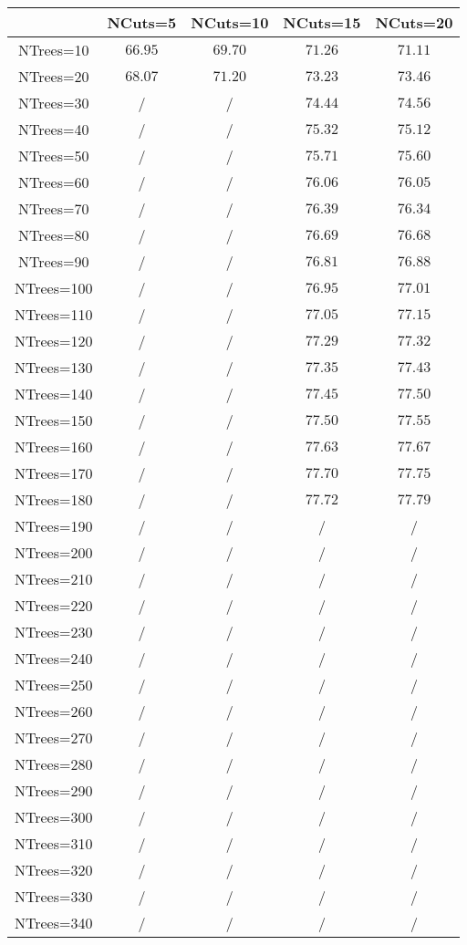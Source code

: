 \centering
\begin{tabular}{|c|c|c|c|c|} \hline
 & NCuts=5 & NCuts=10 & NCuts=15 & NCuts=20\\\hline
NTrees=10 & $66.95$ & $69.70$ & $71.26$ & $71.11$\\\hline
NTrees=20 & $68.07$ & $71.20$ & $73.23$ & $73.46$\\\hline
NTrees=30 &  / &  / & $74.44$ & $74.56$\\\hline
NTrees=40 &  / &  / & $75.32$ & $75.12$\\\hline
NTrees=50 &  / &  / & $75.71$ & $75.60$\\\hline
NTrees=60 &  / &  / & $76.06$ & $76.05$\\\hline
NTrees=70 &  / &  / & $76.39$ & $76.34$\\\hline
NTrees=80 &  / &  / & $76.69$ & $76.68$\\\hline
NTrees=90 &  / &  / & $76.81$ & $76.88$\\\hline
NTrees=100 &  / &  / & $76.95$ & $77.01$\\\hline
NTrees=110 &  / &  / & $77.05$ & $77.15$\\\hline
NTrees=120 &  / &  / & $77.29$ & $77.32$\\\hline
NTrees=130 &  / &  / & $77.35$ & $77.43$\\\hline
NTrees=140 &  / &  / & $77.45$ & $77.50$\\\hline
NTrees=150 &  / &  / & $77.50$ & $77.55$\\\hline
NTrees=160 &  / &  / & $77.63$ & $77.67$\\\hline
NTrees=170 &  / &  / & $77.70$ & $77.75$\\\hline
NTrees=180 &  / &  / & $77.72$ & $77.79$\\\hline
NTrees=190 &  / &  / &  / &  /\\\hline
NTrees=200 &  / &  / &  / &  /\\\hline
NTrees=210 &  / &  / &  / &  /\\\hline
NTrees=220 &  / &  / &  / &  /\\\hline
NTrees=230 &  / &  / &  / &  /\\\hline
NTrees=240 &  / &  / &  / &  /\\\hline
NTrees=250 &  / &  / &  / &  /\\\hline
NTrees=260 &  / &  / &  / &  /\\\hline
NTrees=270 &  / &  / &  / &  /\\\hline
NTrees=280 &  / &  / &  / &  /\\\hline
NTrees=290 &  / &  / &  / &  /\\\hline
NTrees=300 &  / &  / &  / &  /\\\hline
NTrees=310 &  / &  / &  / &  /\\\hline
NTrees=320 &  / &  / &  / &  /\\\hline
NTrees=330 &  / &  / &  / &  /\\\hline
NTrees=340 &  / &  / &  / &  /\\\hline
\end{tabular}
